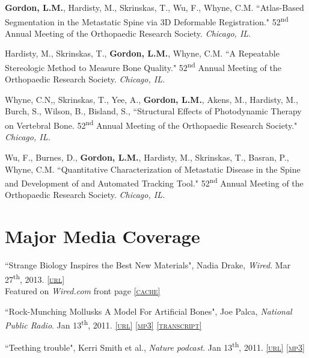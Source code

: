 \textbf{Gordon, L.M.}, Hardisty, M., Skrinskas, T., Wu, F., Whyne, C.M. ``Atlas-Based Segmentation in the Metastatic Spine via 3D Deformable Registration." 52\textsuperscript{nd} Annual Meeting of the Orthopaedic Research Society. \emph{Chicago, IL.}

Hardisty, M., Skrinskas, T., \textbf{Gordon, L.M.}, Whyne, C.M. ``A Repeatable Stereologic Method to Measure Bone Quality." 52\textsuperscript{nd} Annual Meeting of the Orthopaedic Research Society. \emph{Chicago, IL.}

Whyne, C.N,, Skrinskas, T., Yee, A., \textbf{Gordon, L.M.}, Akens, M., Hardisty, M., Burch, S., Wilson, B., Bisland, S., ``Structural Effects of Photodynamic Therapy on Vertebral Bone. 52\textsuperscript{nd} Annual Meeting of the Orthopaedic Research Society." \emph{Chicago, IL.}

Wu, F., Burnes, D., \textbf{Gordon, L.M.}, Hardisty, M., Skrinskas, T., Basran, P., Whyne, C.M. ``Quantitative Characterization of Metastatic Disease in the Spine and Development of and Automated Tracking Tool." 52\textsuperscript{nd} Annual Meeting of the Orthopaedic Research Society. \emph{Chicago, IL.}
\endgroup

\section*{Major Media Coverage}
``Strange Biology Inspires the Best New Materials", Nadia Drake, \emph{Wired}. Mar 27\textsuperscript{th}, 2013. \href{http://www.wired.com/wiredscience/2013/03/biomimetic-materials/?utm_source=feedburner&utm_medium=feed&utm_campaign=Feed%3A+wired%2Findex+%28Wired%3A+Top+Stories%29&pid=6577}{\textsc{\footnotesize{[url]}}}\\ Featured on \emph{Wired.com} front page \href{http://lylegordon.ca/wired.jpg}{\textsc{\footnotesize{[cache]}}}
\begingroup\setlength{\parskip}{0.1cm}

``Rock-Munching Mollusks A Model For Artificial Bones", Joe Palca, \emph{National Public Radio}. Jan 13\textsuperscript{th}, 2011. \href{http://www.npr.org/2011/01/13/132859853/rock-munching-mollusks-a-model-for-artificial-bones}{\textsc{\footnotesize{[url]}}} \href{http://lylegordon.ca/audio/npr-2011-01-13.mp3}{\textsc{\footnotesize{[mp3]}}}  \href{http://lylegordon.ca/nprtranscript.html}{\textsc{\footnotesize{[transcript]}}}

``Teething trouble", Kerri Smith et al., \emph{Nature podcast}. Jan 13\textsuperscript{th}, 2011. \href{http://www.nature.com/nature/podcast/index-2011-01-13.html}{\textsc{\footnotesize{[url]}}} \href{http://lylegordon.ca/audio/nature-2011-01-13.mp3}{\textsc{\footnotesize{[mp3]}}}

